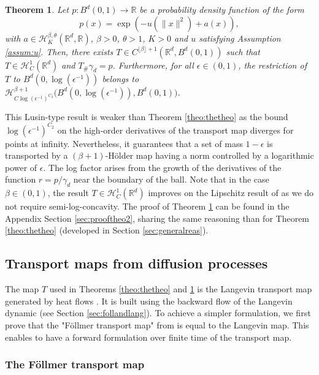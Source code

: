 \documentclass{article}
\newtheorem{theorem}{Theorem}
\begin{document}
\begin{theorem}\label{theo:thetheo2}
Let $p:B^d(0,1)\rightarrow \mathbb{R}$ be a probability density function of the form $$p(x)=\exp\left(-u(\|x\|^2)+a(x)\right),$$
with $a \in \mathcal{H}^{\beta,\theta}_K(\mathbb{R}^d,\mathbb{R})$, $\beta>0$, $\theta>1$, $K>0$
and $u$ satisfying Assumption \ref{assum:u}.
     Then, there exists $T\in C^{\lfloor \beta \rfloor+1}(\mathbb{R}^d,B^d(0,1))$ such that  $ T\in  \mathcal{H}^{1}_C  (\mathbb{R}^d)$ and $T_{\#}\gamma_d=p$. Furthermore, for all $\epsilon\in (0,1)$, the restriction of $T$ to $B^d(0,\log(\epsilon^{-1}))$ belongs to $ \mathcal{H}_{C\log(\epsilon^{-1})^{C_2}}^{\beta+1}\Big(B^d(0,\log(\epsilon^{-1})),B^d(0,1)\Big)$.
\end{theorem}
This Lusin-type result is weaker than Theorem \ref{theo:thetheo} as the bound $\log(\epsilon^{-1})^{C_2}$ on the high-order derivatives of the transport map diverges for points at infinity. Nevertheless, it guarantees that a set of mass $1-\epsilon$ is transported by a $(\beta+1)$-Hölder map having a norm controlled by a logarithmic power of $\epsilon$. The log factor arises from the growth of the derivatives of the function $r=p/\gamma_d$ near the boundary of the ball.  Note that in the case $\beta \in (0,1)$, the result $ T\in  \mathcal{H}^{1}_C  (\mathbb{R}^d)$ improves on the Lipschitz result of \cite{dai2023lipschitz} as we do not require semi-log-concavity. 
The proof of Theorem \ref{theo:thetheo2} can be found in the Appendix Section \ref{sec:prooftheo2}, sharing the same reasoning than for Theorem \ref{theo:thetheo} (developed in Section
\ref{sec:generalreas}).

\subsection{Transport maps from diffusion processes}
The map $T$ used in Theorems \ref{theo:thetheo} and \ref{theo:thetheo2} is the Langevin transport map generated by heat flows \citep{fathi2024transportation}. It is built using the backward flow of the Langevin dynamic (see Section \ref{sec:follandlang}). To achieve a simpler formulation, we first prove that
the "Föllmer transport map" from \cite{dai2023lipschitz} is equal to the Langevin map. This enables to have a forward formulation over finite time of the transport map.
\subsubsection{The Föllmer transport map}
\end{document}
